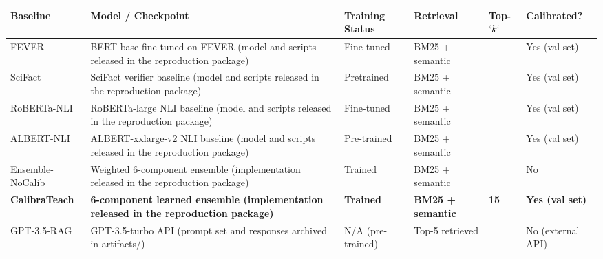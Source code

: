 {\def\LTcaptype{none} %
\begin{longtable}[]{@{}
  >{\raggedright\arraybackslash}p{}
  >{\raggedright\arraybackslash}p{}
  >{\raggedright\arraybackslash}p{}
  >{\centering\arraybackslash}p{}
  >{\centering\arraybackslash}p{}
  >{\centering\arraybackslash}p{}@{}}
\toprule\noalign{}
\begin{minipage}[b]{\linewidth}\raggedright
\textbf{Baseline}
\end{minipage} & \begin{minipage}[b]{\linewidth}\raggedright
\textbf{Model / Checkpoint}
\end{minipage} & \begin{minipage}[b]{\linewidth}\raggedright
\textbf{Training Status}
\end{minipage} & \begin{minipage}[b]{\linewidth}\centering
\textbf{Retrieval}
\end{minipage} & \begin{minipage}[b]{\linewidth}\centering
\textbf{Top-\(`k`\)}
\end{minipage} & \begin{minipage}[b]{\linewidth}\centering
\textbf{Calibrated?}
\end{minipage} \\
\midrule\noalign{}
\endhead
\bottomrule\noalign{}
\endlastfoot
FEVER & BERT-base fine-tuned on FEVER (model and scripts released in the reproduction package) & Fine-tuned & BM25 + semantic & 15 & Yes (val set) \\
SciFact & SciFact verifier baseline (model and scripts released in the reproduction package) & Pretrained & BM25 + semantic & 15 & Yes (val set) \\
RoBERTa-NLI & RoBERTa-large NLI baseline (model and scripts released in the reproduction package) & Fine-tuned & BM25 + semantic & 15 & Yes (val set) \\
ALBERT-NLI & ALBERT-xxlarge-v2 NLI baseline (model and scripts released in the reproduction package) & Pre-trained & BM25 + semantic & 15 & Yes (val set) \\
Ensemble-NoCalib & Weighted 6-component ensemble (implementation released in the reproduction package) & Trained & BM25 + semantic & 15 & No \\
\textbf{CalibraTeach} & \textbf{6-component learned ensemble (implementation released in the reproduction package)} & \textbf{Trained} & \textbf{BM25 + semantic} & \textbf{15} & \textbf{Yes (val set)} \\
GPT-3.5-RAG & GPT-3.5-turbo API (prompt set and responses archived in artifacts/) & N/A (pre-trained) & Top-5 retrieved & 5 & No (external API) \\
\end{longtable}
}

